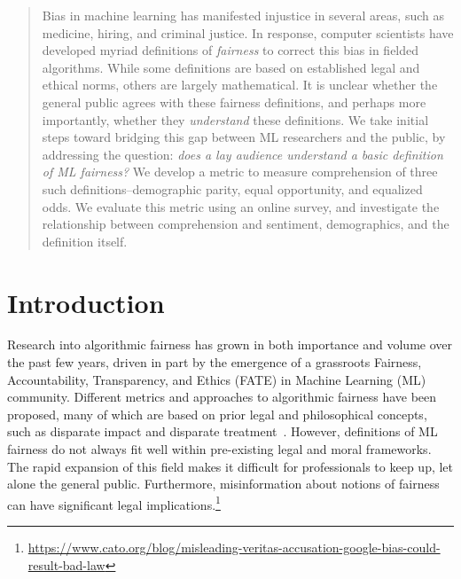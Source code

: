 \documentclass{article}
\begin{document}



\printAffiliationsAndNotice{}  

\begin{abstract}
Bias in machine learning has manifested injustice in several areas, such as medicine, hiring, and criminal justice. In response, computer scientists have developed myriad definitions of \emph{fairness} to correct this bias in fielded algorithms. While some definitions are based on established legal and ethical norms, others are largely mathematical. It is unclear whether the general public agrees with these fairness definitions, and perhaps more importantly, whether they \emph{understand} these definitions.  We take initial steps toward bridging this gap between ML researchers and the public, by addressing the question: \emph{does a lay audience understand a basic definition of ML fairness?} We develop a metric to measure comprehension of three such definitions--demographic parity, equal opportunity, and equalized odds. We evaluate this metric using an online survey, and investigate the relationship between comprehension and sentiment, demographics, and the definition itself.
\end{abstract}

\section{Introduction}
Research into algorithmic fairness has grown in both importance and volume over the past few years, driven in part by the emergence of a grassroots Fairness, Accountability, Transparency, and Ethics (FATE) in Machine Learning (ML) community.  Different metrics and approaches to algorithmic fairness have been proposed, many of which are based on prior legal and philosophical concepts, such as disparate impact and disparate treatment~\cite{feldman2015certifying,chouldechova2017fair,binns2017fairness}. However, definitions of ML fairness do not always fit well within pre-existing legal and moral frameworks. The rapid expansion of this field makes it difficult for professionals to keep up, let alone the general public.
Furthermore, misinformation about notions of fairness can have significant legal implications.\footnote{\url{https://www.cato.org/blog/misleading-veritas-accusation-google-bias-could-result-bad-law}}
\end{document}
